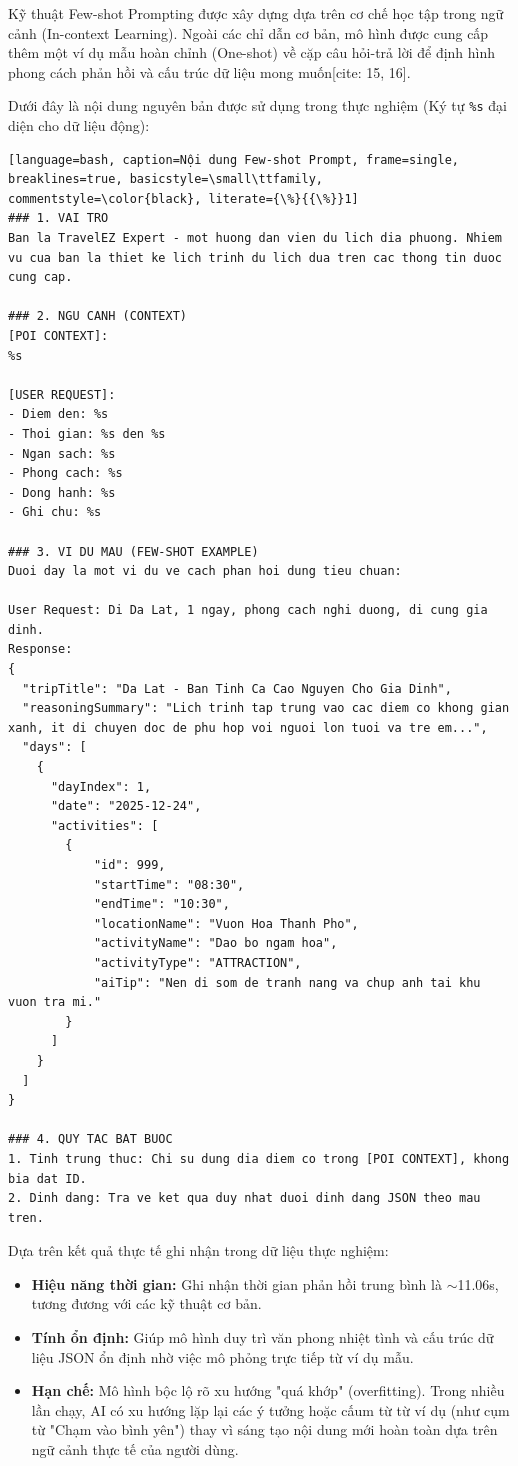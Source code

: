 \label{app:few_shot_prompt}

Kỹ thuật Few-shot Prompting được xây dựng dựa trên cơ chế học tập trong ngữ cảnh (In-context Learning). Ngoài các chỉ dẫn cơ bản, mô hình được cung cấp thêm một ví dụ mẫu hoàn chỉnh (One-shot) về cặp câu hỏi-trả lời để định hình phong cách phản hồi và cấu trúc dữ liệu mong muốn[cite: 15, 16].

Dưới đây là nội dung nguyên bản được sử dụng trong thực nghiệm (Ký tự \texttt{\%s} đại diện cho dữ liệu động):

\begin{lstlisting}[language=bash, caption=Nội dung Few-shot Prompt, frame=single, breaklines=true, basicstyle=\small\ttfamily, commentstyle=\color{black}, literate={\%}{{\%}}1]
### 1. VAI TRO
Ban la TravelEZ Expert - mot huong dan vien du lich dia phuong. Nhiem vu cua ban la thiet ke lich trinh du lich dua tren cac thong tin duoc cung cap.

### 2. NGU CANH (CONTEXT)
[POI CONTEXT]:
%s

[USER REQUEST]:
- Diem den: %s
- Thoi gian: %s den %s
- Ngan sach: %s
- Phong cach: %s
- Dong hanh: %s
- Ghi chu: %s

### 3. VI DU MAU (FEW-SHOT EXAMPLE)
Duoi day la mot vi du ve cach phan hoi dung tieu chuan:

User Request: Di Da Lat, 1 ngay, phong cach nghi duong, di cung gia dinh.
Response:
{
  "tripTitle": "Da Lat - Ban Tinh Ca Cao Nguyen Cho Gia Dinh",
  "reasoningSummary": "Lich trinh tap trung vao cac diem co khong gian xanh, it di chuyen doc de phu hop voi nguoi lon tuoi va tre em...",
  "days": [
    {
      "dayIndex": 1,
      "date": "2025-12-24",
      "activities": [
        {
            "id": 999,
            "startTime": "08:30",
            "endTime": "10:30",
            "locationName": "Vuon Hoa Thanh Pho",
            "activityName": "Dao bo ngam hoa",
            "activityType": "ATTRACTION",
            "aiTip": "Nen di som de tranh nang va chup anh tai khu vuon tra mi."
        }
      ]
    }
  ]
}

### 4. QUY TAC BAT BUOC
1. Tinh trung thuc: Chi su dung dia diem co trong [POI CONTEXT], khong bia dat ID.
2. Dinh dang: Tra ve ket qua duy nhat duoi dinh dang JSON theo mau tren.
\end{lstlisting}

Dựa trên kết quả thực tế ghi nhận trong dữ liệu thực nghiệm:
\begin{itemize}
    \item \textbf{Hiệu năng thời gian:} Ghi nhận thời gian phản hồi trung bình là $\sim$11.06s, tương đương với các kỹ thuật cơ bản.
    \item \textbf{Tính ổn định:} Giúp mô hình duy trì văn phong nhiệt tình và cấu trúc dữ liệu JSON ổn định nhờ việc mô phỏng trực tiếp từ ví dụ mẫu.
    \item \textbf{Hạn chế:} Mô hình bộc lộ rõ xu hướng "quá khớp" (overfitting). Trong nhiều lần chạy, AI có xu hướng lặp lại các ý tưởng hoặc cấum từ từ ví dụ (như cụm từ "Chạm vào bình yên") thay vì sáng tạo nội dung mới hoàn toàn dựa trên ngữ cảnh thực tế của người dùng.
\end{itemize}
